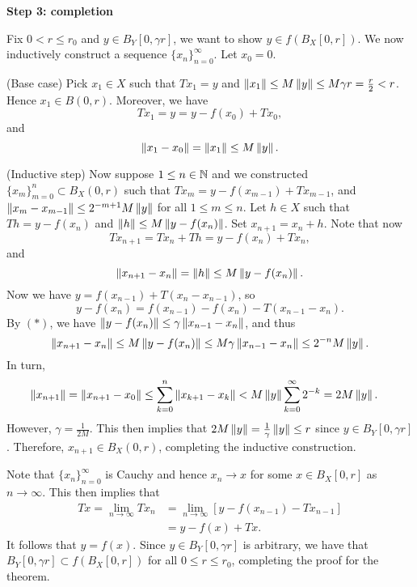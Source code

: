 \documentclass[a4paper]{article}
\renewcommand{\seqinfn}[1]{\{ #1 \}_{n=0}^\infty}
\renewcommand{\suminfk}{\sum_{k=0}^\infty}
\renewcommand{\sumk}{\sum_{k=0}}
\begin{document}
\textbf{Step 3: completion}

Fix $0 < r \leq r_0$ and $y \in B_Y[0, \gamma r]$, we want 
to show $y \in f (B_X [0, r])$. We now inductively 
construct a sequence $\seqinfn{x_n}$. Let $x_0 = 0$.

(Base case) Pick $x_1 \in X$ such that $T x_1 = y$ and 
$\left\lVert x_1\right\rVert \leq M \left\lVert y\right\rVert \leq M \gamma r = \frac{r}{2} 
< r$. Hence $x_1 \in B(0, r)$. Moreover, we have 
\[
T x_1 = y = y - f(x_0) + T x_0,
\]
and 
\[
\left\lVert x_1 - x_0\right\rVert = \left\lVert x_1\right\rVert \leq M \left\lVert y\right\rVert.
\]

(Inductive step) Now suppose $1 \leq n \in \mathbb{N}$ and we 
constructed $\{x_m\}_{m=0}^n \subset B_X(0, r)$ such that 
$T x_m = y - f(x_{m - 1}) + T x_{m - 1}$, and
$\left\lVert x_m - x_{m - 1}\right\rVert \leq 2^{-m + 1} M 
\left\lVert y\right\rVert$ for all $1 \leq m \leq n$.
Let $h \in X$ such that $T h = y - f(x_n)$ and 
$\left\lVert h\right\rVert \leq M \left\lVert y - f(x_n)\right\rVert$. Set $x_{n + 1} 
= x_n + h$. Note that now 
\[
T x_{n + 1} = T x_n + T h = y - f(x_n) + T x_n,
\]
and 
\[
\left\lVert x_{n + 1} - x_n\right\rVert = \left\lVert h\right\rVert \leq M \left\lVert y - f(x_n)\right\rVert.
\]
Now we have $y = f(x_{n - 1}) + T(x_n - x_{n - 1})$, 
so 
\[
y - f(x_n) = f(x_{n - 1}) - f(x_n) - T(x_{n - 1} - x_n).
\]
By $(*)$, we have $\left\lVert y - f(x_n)\right\rVert \leq \gamma 
\left\lVert x_{n - 1} - x_n\right\rVert$, and thus
\[
\left\lVert x_{n + 1} - x_n\right\rVert \leq M \left\lVert y - f(x_n)\right\rVert
\leq M \gamma \left\lVert x_{n - 1} - x_n\right\rVert 
\leq 2^{- n} M \left\lVert y\right\rVert.
\]
In turn, 
\[
\begin{aligned}
\norm{x_{n + 1}} = \norm{x_{n + 1} - x_0} 
&\leq \sumk^n \norm{x_{k+1} - x_k} 
< M \norm{y} \suminfk 2^{-k} 
= 2 M \norm{y}.
\end{aligned}
\]
However, $\gamma = \frac{1}{2 M}$. This then implies that
$2 M \left\lVert y\right\rVert = \frac{1}{\gamma} \left\lVert y\right\rVert \leq r$
since $y \in B_Y[0, \gamma r]$.
Therefore, $x_{n + 1} \in B_X(0, r)$, completing
the inductive construction.

Note that $\seqinfn{x_n}$ is Cauchy and hence $x_n \to x$ 
for some $x \in B_X[0, r]$ as $n \to \infty$. This then 
implies that 
\[
\begin{aligned}
  T x = \lim_{n \to \infty} T x_n 
  &= \lim_{n \to \infty} [y - f(x_{n - 1}) - T x_{n - 1}] \\
  &= y - f(x) + T x.
\end{aligned}
\]
It follows that $y = f(x)$. Since $y \in B_Y [0, \gamma r]$
is arbitrary, we have that $B_Y [0, \gamma r] 
\subset f(B_X [0, r])$ for all $0 \leq r \leq r_0$, completing
the proof for the theorem.
\end{document}
